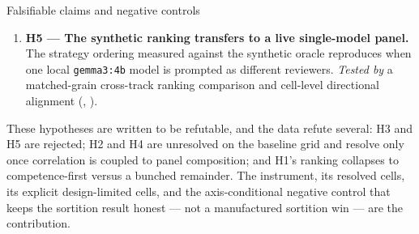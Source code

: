 \documentclass[
  ignorenonframetext,
]{beamer}
\begin{document}
\begin{frame}{Falsifiable claims and negative
controls}
\begin{enumerate}
{  with it.} A controlled correlation injection produces a realized
  error-correlation that NTQR itself reports, and oracle-referenced
  recovery error should rise as that realized correlation grows.
  \emph{Tested by} the tolerance sweep, reporting the
  realized-correlation trend and an OLS recovery-vs-correlation slope
  with a bootstrap interval (); the recovery slope,
  unresolved by the global-injection sweep, is resolved positive once
  the correlation is composition-coupled and marginal-preserving
  ().
\item
  \textbf{H5 --- The synthetic ranking transfers to a live single-model
  panel.} The strategy ordering measured against the synthetic oracle
  reproduces when one local \texttt{gemma3:4b} model is prompted as
  different reviewers. \emph{Tested by} a matched-grain cross-track
  ranking comparison and cell-level directional alignment
  (, ).
\end{enumerate}

These hypotheses are written to be refutable, and the data refute
several: H3 and H5 are rejected; H2 and H4 are unresolved on the
baseline grid and resolve only once correlation is coupled to panel
composition; and H1's ranking collapses to competence-first versus a
bunched remainder. The instrument, its resolved cells, its explicit
design-limited cells, and the axis-conditional negative control that
keeps the sortition result honest --- not a manufactured sortition win
--- are the contribution.
\end{frame}
\end{document}
